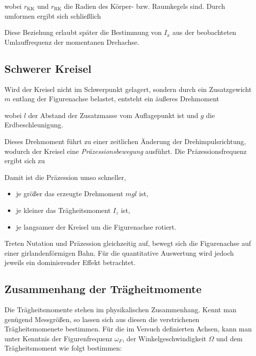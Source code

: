 
wobei $r_{\mathrm{KK}}$ und $r_{\mathrm{RK}}$ die Radien des Körper- bzw. Raumkegels sind.  
Durch umformen ergibt sich schließlich


Diese Beziehung erlaubt später die Bestimmung von $I_x$ aus der beobachteten Umlauffrequenz der momentanen Drehachse.

\subsection{Schwerer Kreisel}\label{ssec:SchwerKrei}

Wird der Kreisel nicht im Schwerpunkt gelagert, sondern durch ein Zusatzgewicht $m$ entlang der Figurenachse belastet, entsteht ein äußeres Drehmoment


wobei $l$ der Abstand der Zusatzmasse vom Auflagepunkt ist und $g$ die Erdbeschleunigung.

Dieses Drehmoment führt zu einer zeitlichen Änderung der Drehimpulsrichtung, wodurch der Kreisel eine \emph{Präzessionsbewegung} ausführt.  
Die Präzessionsfrequenz ergibt sich zu



Damit ist die Präzession umso schneller,
\begin{itemize}
    \item je größer das erzeugte Drehmoment $mgl$ ist,
    \item je kleiner das Trägheitsmoment $I_z$ ist,
    \item je langsamer der Kreisel um die Figurenachse rotiert.
\end{itemize}

Treten Nutation und Präzession gleichzeitig auf, bewegt sich die Figurenachse auf einer girlandenförmigen Bahn.  
Für die quantitative Auswertung wird jedoch jeweils ein dominierender Effekt betrachtet.


\subsection{Zusammenhang der Trägheitmomente}\label{ssec:zumHangTraeg}
Die Trägheitsmomente stehen im physikalischen Zusammenhang. Kennt man genügend Messgrößen, so lassen sich aus diesen die verstrichenen Trägheitsmomenete bestimmen. 
Für die im Versuch definierten Achsen, kann man unter Kenntnis der Figurenfrequenz $\omega_F$, der Winkelgeschwindigkeit $\Omega$ und dem Trägheitsmoment wie folgt bestimmen:

